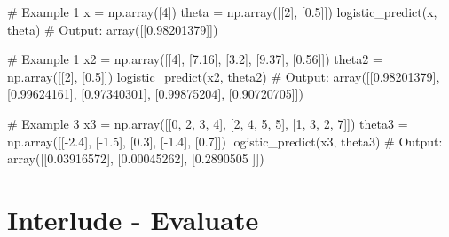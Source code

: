 \documentclass[]{article}
\newenvironment{Shaded}{\begin{snugshade}}{\end{snugshade}}
\newcommand{\CommentTok}[1]{\textcolor[rgb]{0.48,0.49,0.49}{#1}}
\newcommand{\DecValTok}[1]{\textcolor[rgb]{0.96,0.45,0.00}{#1}}
\newcommand{\FloatTok}[1]{\textcolor[rgb]{0.96,0.45,0.00}{#1}}
\newcommand{\NormalTok}[1]{\textcolor[rgb]{0.81,0.81,0.76}{#1}}
\newcommand{\OperatorTok}[1]{\textcolor[rgb]{0.81,0.81,0.76}{#1}}
\begin{document}
\begin{Shaded}
\begin{Highlighting}[]
\CommentTok{# Example 1}
\NormalTok{x }\OperatorTok{=}\NormalTok{ np.array([}\DecValTok{4}\NormalTok{])}
\NormalTok{theta }\OperatorTok{=}\NormalTok{ np.array([[}\DecValTok{2}\NormalTok{], [}\FloatTok{0.5}\NormalTok{]])}
\NormalTok{logistic_predict(x, theta)}
\CommentTok{# Output: }
\NormalTok{array([[}\FloatTok{0.98201379}\NormalTok{]])}

\CommentTok{# Example 1}
\NormalTok{x2 }\OperatorTok{=}\NormalTok{ np.array([[}\DecValTok{4}\NormalTok{], [}\FloatTok{7.16}\NormalTok{], [}\FloatTok{3.2}\NormalTok{], [}\FloatTok{9.37}\NormalTok{], [}\FloatTok{0.56}\NormalTok{]])}
\NormalTok{theta2 }\OperatorTok{=}\NormalTok{ np.array([[}\DecValTok{2}\NormalTok{], [}\FloatTok{0.5}\NormalTok{]]) }
\NormalTok{logistic_predict(x2, theta2)}
\CommentTok{# Output: }
\NormalTok{array([[}\FloatTok{0.98201379}\NormalTok{],}
\NormalTok{       [}\FloatTok{0.99624161}\NormalTok{],}
\NormalTok{       [}\FloatTok{0.97340301}\NormalTok{],}
\NormalTok{       [}\FloatTok{0.99875204}\NormalTok{],}
\NormalTok{       [}\FloatTok{0.90720705}\NormalTok{]])}

\CommentTok{# Example 3}
\NormalTok{x3 }\OperatorTok{=}\NormalTok{ np.array([[}\DecValTok{0}\NormalTok{, }\DecValTok{2}\NormalTok{, }\DecValTok{3}\NormalTok{, }\DecValTok{4}\NormalTok{], [}\DecValTok{2}\NormalTok{, }\DecValTok{4}\NormalTok{, }\DecValTok{5}\NormalTok{, }\DecValTok{5}\NormalTok{], [}\DecValTok{1}\NormalTok{, }\DecValTok{3}\NormalTok{, }\DecValTok{2}\NormalTok{, }\DecValTok{7}\NormalTok{]])}
\NormalTok{theta3 }\OperatorTok{=}\NormalTok{ np.array([[}\OperatorTok{-}\FloatTok{2.4}\NormalTok{], [}\OperatorTok{-}\FloatTok{1.5}\NormalTok{], [}\FloatTok{0.3}\NormalTok{], [}\OperatorTok{-}\FloatTok{1.4}\NormalTok{], [}\FloatTok{0.7}\NormalTok{]])}
\NormalTok{logistic_predict(x3, theta3)}
\CommentTok{# Output: }
\NormalTok{array([[}\FloatTok{0.03916572}\NormalTok{],}
\NormalTok{       [}\FloatTok{0.00045262}\NormalTok{],}
\NormalTok{       [}\FloatTok{0.2890505}\NormalTok{ ]])}
\end{Highlighting}
\end{Shaded}

\clearpage

\hypertarget{interlude---evaluate-1}{%
\section{Interlude - Evaluate}\label{interlude---evaluate-1}}
\end{document}
